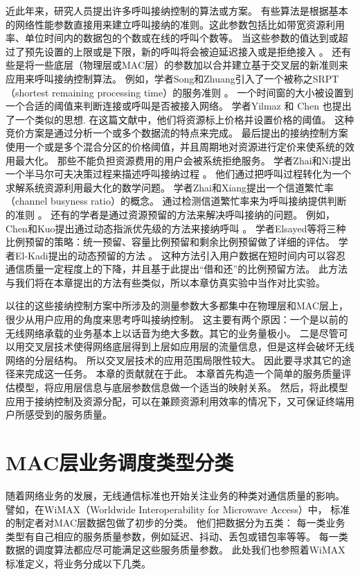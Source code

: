 近此年来，研究人员提出许多呼叫接纳控制的算法或方案。
有些算法是根据基本的网络性能参数直接用来建立呼叫接纳的准则。这此参数包括比如带宽资源利用率、单位时间内的数据包的个数或在线的呼叫个数等。
当这些参数的值达到或超过了预先设置的上限或是下限，新的呼叫将会被迫延迟接入或是拒绝接入\cite{Y-Qian.TWC.2006} \cite{G-Djuka.TELSIK.2007}。
还有些是将一些底层（物理层或MAC层）的参数加以合并建立基于交叉层的新准则来应用来呼叫接纳控制算法。
例如，学者Song和Zhuang引入了一个被称之SRPT（shortest remaining processing time）的服务准则 \cite{Song2009}。
一个时间窗的大小被设置到一个合适的阈值来判断连接或呼叫是否被接入网络。
学者Yilmaz 和 Chen 也提出了一个类似的思想\cite{Yilmax2009}.
在这篇文献中，他们将资源标上价格并设置价格的阈值。
这种竞价方案是通过分析一个或多个数据流的特点来完成。
最后提出的接纳控制方案使用一个或是多个混合分区的价格阈值，并且周期地对资源进行定价来使系统的效用最大化。
那些不能负担资源费用的用户会被系统拒绝服务。
学者Zhai和Ni提出一个半马尔可夫决策过程来描述呼叫接纳过程 \cite{Zhai2005,Ni2009}。
他们通过把呼叫过程转化为一个求解系统资源利用最大化的数学问题。
学者Zhai和Xiang提出一个信道繁忙率（channel busyness ratio）的概念。
通过检测信道繁忙率来为呼叫接纳提供判断的准则 \cite{Zhai_Chen_Fang_2006}。
还有的学者是通过资源预留的方法来解决呼叫接纳的问题。
例如，Chen和Kuo提出通过动态指派优先级的方法来接纳呼叫 \cite{Chen_Kumar_Kuo_2003,Chen_Kuo_2004}。
学者Elsayed等将三种比例预留的策略：统一预留、容量比例预留和剩余比例预留做了详细的评估\cite{Elsayed02performanceevaluation}。
学者El-Kadi提出的动态预留的方法 \cite{EL-Kadi2002}。
这种方法引入用户数据在短时间内可以容忍通信质量一定程度上的下降，并且基于此提出“借和还”的比例预留方法。
此方法与我们将在本章提出的方法有些类似，所以本章仿真实验中当作对比实验。

以往的这些接纳控制方案中所涉及的测量参数大多都集中在物理层和MAC层上，很少从用户应用的角度来思考呼叫接纳控制。
这主要有两个原因：一个是以前的无线网络承载的业务基本上以话音为绝大多数。其它的业务量极小。
二是尽管可以用交叉层技术使得网络底层得到上层如应用层的流量信息，但是这样会破坏无线网络的分层结构。
所以交叉层技术的应用范围局限性较大。
因此要寻求其它的途径来完成这一任务。
本章的贡献就在于此。
本章首先构造一个简单的服务质量评估模型，将应用层信息与底层参数信息做一个适当的映射关系。
然后，将此模型应用于接纳控制及资源分配，可以在兼顾资源利用效率的情况下，又可保证终端用户所感受到的服务质量。
%
\section{MAC层业务调度类型分类}
随着网络业务的发展，无线通信标准也开始关注业务的种类对通信质量的影响。
譬如，在WiMAX（Worldwide Interoperability for Microwave Access）中，
标准的制定者对MAC层数据包做了初步的分类。
他们把数据分为五类：
每一类业务类型有自己相应的服务质量参数，例如延迟、抖动、丢包或错包率等等。
每一类数据的调度算法都应尽可能满足这些服务质量参数\cite{Tsagkaris_Demestichas_2009}\cite{Andrews_Ghosh_Muhamed_2007}。
此处我们也参照着WiMAX标准定义，将业务分成以下几类。

